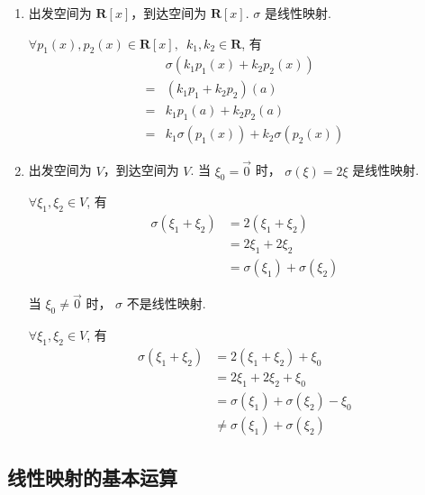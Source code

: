 \begin{solution}
\begin{enumerate}
        \item 出发空间为 $ \mathbf{R}[x] $，到达空间为 $ \mathbf{R}[x] $. $ \sigma $ 是线性映射.

              $ \forall p_1(x), p_2(x) \in \mathbf{R}[x],\enspace k_1, k_2 \in \mathbf{R} $, 有
              \begin{align*}
                      & \sigma(k_1 p_1(x) + k_2 p_2(x))         \\
                  ={} & (k_1 p_1 + k_2 p_2)(a)                  \\
                  ={} & k_1 p_1(a) + k_2 p_2(a)                 \\
                  ={} & k_1 \sigma(p_1(x)) + k_2 \sigma(p_2(x))
              \end{align*}

        \item 出发空间为 $ V $，到达空间为 $ V $. 当 $ \xi_0 = \vec{0} $ 时， $ \sigma(\xi) = 2 \xi $ 是线性映射.

              $ \forall \xi_1, \xi_2 \in V $, 有
              \begin{align*}
                  \sigma(\xi_1 + \xi_2) & = 2(\xi_1 + \xi_2)              \\
                                        & = 2 \xi_1 + 2 \xi_2             \\
                                        & = \sigma(\xi_1) + \sigma(\xi_2)
              \end{align*}

              当 $ \xi_0 \neq \vec{0} $ 时， $ \sigma $ 不是线性映射.

              $ \forall \xi_1, \xi_2 \in V $, 有
              \begin{align*}
                  \sigma(\xi_1 + \xi_2) & = 2(\xi_1 + \xi_2) + \xi_0              \\
                                        & = 2 \xi_1 + 2 \xi_2 + \xi_0             \\
                                        & = \sigma(\xi_1) + \sigma(\xi_2) - \xi_0 \\
                                        & \neq \sigma(\xi_1) + \sigma(\xi_2)
              \end{align*}
    \end{enumerate}
\end{solution}

\subsection{线性映射的基本运算}

